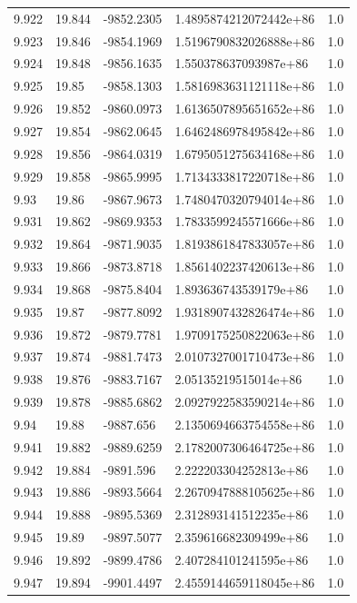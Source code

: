 \begin{tabular}{lllll}
9.922 & 19.844 & -9852.2305 & 1.4895874212072442e+86 & 1.0 \\
9.923 & 19.846 & -9854.1969 & 1.5196790832026888e+86 & 1.0 \\
9.924 & 19.848 & -9856.1635 & 1.550378637093987e+86 & 1.0 \\
9.925 & 19.85 & -9858.1303 & 1.5816983631121118e+86 & 1.0 \\
9.926 & 19.852 & -9860.0973 & 1.6136507895651652e+86 & 1.0 \\
9.927 & 19.854 & -9862.0645 & 1.6462486978495842e+86 & 1.0 \\
9.928 & 19.856 & -9864.0319 & 1.6795051275634168e+86 & 1.0 \\
9.929 & 19.858 & -9865.9995 & 1.7134333817220718e+86 & 1.0 \\
9.93 & 19.86 & -9867.9673 & 1.7480470320794014e+86 & 1.0 \\
9.931 & 19.862 & -9869.9353 & 1.7833599245571666e+86 & 1.0 \\
9.932 & 19.864 & -9871.9035 & 1.8193861847833057e+86 & 1.0 \\
9.933 & 19.866 & -9873.8718 & 1.8561402237420613e+86 & 1.0 \\
9.934 & 19.868 & -9875.8404 & 1.893636743539179e+86 & 1.0 \\
9.935 & 19.87 & -9877.8092 & 1.9318907432826474e+86 & 1.0 \\
9.936 & 19.872 & -9879.7781 & 1.9709175250822063e+86 & 1.0 \\
9.937 & 19.874 & -9881.7473 & 2.0107327001710473e+86 & 1.0 \\
9.938 & 19.876 & -9883.7167 & 2.05135219515014e+86 & 1.0 \\
9.939 & 19.878 & -9885.6862 & 2.0927922583590214e+86 & 1.0 \\
9.94 & 19.88 & -9887.656 & 2.1350694663754558e+86 & 1.0 \\
9.941 & 19.882 & -9889.6259 & 2.1782007306464725e+86 & 1.0 \\
9.942 & 19.884 & -9891.596 & 2.222203304252813e+86 & 1.0 \\
9.943 & 19.886 & -9893.5664 & 2.2670947888105625e+86 & 1.0 \\
9.944 & 19.888 & -9895.5369 & 2.312893141512235e+86 & 1.0 \\
9.945 & 19.89 & -9897.5077 & 2.359616682309499e+86 & 1.0 \\
9.946 & 19.892 & -9899.4786 & 2.407284101241595e+86 & 1.0 \\
9.947 & 19.894 & -9901.4497 & 2.4559144659118045e+86 & 1.0 \\

\end{tabular}
